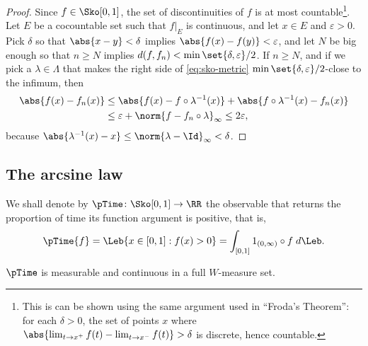 \documentclass[../main]{subfiles}
\begin{document}
\begin{proof}
  Since \(f \in \WPS\), the set of discontinuities of \(f\) is at most countable\footnote{This is can be shown using the same argument used in ``Froda's Theorem'': for each \(\delta > 0\), the set of points \(x\) where \(\abs{\lim_{t \to x^+}f(t) - \lim_{t \to x^-}f(t)} > \delta\) is discrete, hence countable.}. Let \(E\) be a cocountable set such that \(f|_E\) is continuous, and let \(x \in E\) and \(\varepsilon > 0\). Pick \(\delta\) so that \(\abs{x - y} < \delta\) implies \(\abs{f(x) - f(y)} < \varepsilon\), and let \(N\) be big enough so that \(n \ge N\) implies \(d(f,f_n) < \min\set{\delta, \varepsilon}/2\). If \(n \ge N\), and if we pick a \(\lambda \in \Lambda\) that makes the right side of \cref{eq:sko-metric} \(\min\set{\delta, \varepsilon}/2\)-close to the infimum, then
  \begin{align*}
    \abs{f(x) - f_n(x)} &\le \abs{f(x) - f \circ \lambda ^{-1}(x)} + \abs{f \circ \lambda ^{-1}(x) - f_n(x)}\\
                        &\le  \varepsilon + \norm{f - f_n \circ \lambda}_{\infty} \le 2\varepsilon,
  \end{align*}
  because \(\abs{\lambda ^{-1}(x) - x} \le \norm{\lambda - \Id}_{\infty} < \delta\).

  
\end{proof}

\subsection{The arcsine law}

\begin{definition}
  We shall denote by \(\pTime \colon \WPS \to \RR\) the observable that returns the proportion of time its function argument is positive, that is,
  \[\pTime{f} = \Leb \{ x \in [0,1] : f(x) > 0 \} = \int_{[0,1]} 1_{(0,\infty)} \circ f\;d\Leb.\]
\end{definition}


\begin{lemma}\label{lem:ptime-continuous}
  \(\pTime\) is measurable and continuous in a full \(W\)-measure set.
\end{lemma}
\end{document}
